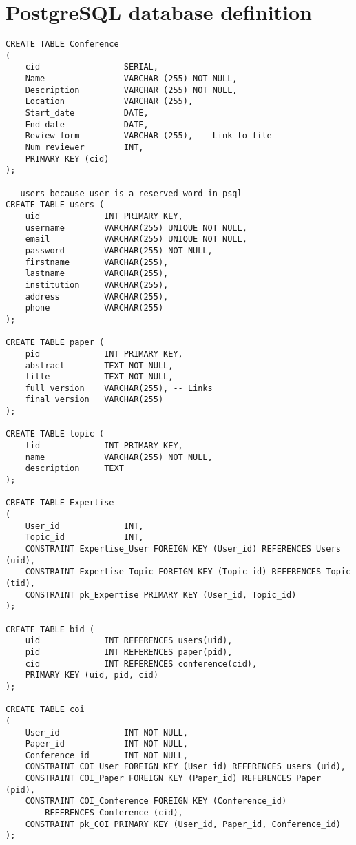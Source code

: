 \documentclass[12pt]{article}
\newcommand{\<}{\langle}
\renewcommand{\>}{\rangle}
\begin{document}
\part{PostgreSQL database definition}

\begin{verbatim}
CREATE TABLE Conference
(
    cid                 SERIAL,
    Name                VARCHAR (255) NOT NULL,
    Description         VARCHAR (255) NOT NULL,
    Location            VARCHAR (255),
    Start_date          DATE,
    End_date            DATE,
    Review_form         VARCHAR (255), -- Link to file
    Num_reviewer        INT,
    PRIMARY KEY (cid)    
);

-- users because user is a reserved word in psql
CREATE TABLE users (
    uid             INT PRIMARY KEY,
    username        VARCHAR(255) UNIQUE NOT NULL,
    email           VARCHAR(255) UNIQUE NOT NULL,
    password        VARCHAR(255) NOT NULL,
    firstname       VARCHAR(255),
    lastname        VARCHAR(255),
    institution     VARCHAR(255),
    address         VARCHAR(255),
    phone           VARCHAR(255)
);

CREATE TABLE paper (
    pid             INT PRIMARY KEY,
    abstract        TEXT NOT NULL,
    title           TEXT NOT NULL,
    full_version    VARCHAR(255), -- Links
    final_version   VARCHAR(255)
);

CREATE TABLE topic (
    tid             INT PRIMARY KEY,
    name            VARCHAR(255) NOT NULL,
    description     TEXT
);

CREATE TABLE Expertise 
(
    User_id             INT,
    Topic_id            INT,
    CONSTRAINT Expertise_User FOREIGN KEY (User_id) REFERENCES Users (uid),
    CONSTRAINT Expertise_Topic FOREIGN KEY (Topic_id) REFERENCES Topic (tid),
    CONSTRAINT pk_Expertise PRIMARY KEY (User_id, Topic_id)
);

CREATE TABLE bid (
    uid             INT REFERENCES users(uid),
    pid             INT REFERENCES paper(pid),
    cid             INT REFERENCES conference(cid),
    PRIMARY KEY (uid, pid, cid)
);

CREATE TABLE coi
(
    User_id             INT NOT NULL,
    Paper_id            INT NOT NULL,
    Conference_id       INT NOT NULL,
    CONSTRAINT COI_User FOREIGN KEY (User_id) REFERENCES users (uid),
    CONSTRAINT COI_Paper FOREIGN KEY (Paper_id) REFERENCES Paper (pid),
    CONSTRAINT COI_Conference FOREIGN KEY (Conference_id) 
        REFERENCES Conference (cid),
    CONSTRAINT pk_COI PRIMARY KEY (User_id, Paper_id, Conference_id)
);


\end{verbatim}
\end{document}
